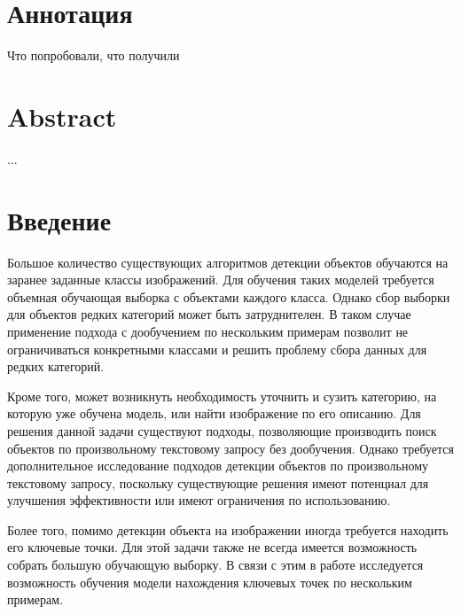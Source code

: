 \documentclass[a4paper,14pt]{article}
\begin{document}
    

    \section*{\normalsize \hfill Аннотация \hfill}

    Что попробовали, что получили

    \sloppy
    \newpage

    \section*{\normalsize \hfill Abstract \hfill}

    ...

    \newpage

    \tableofcontents
    \pagebreak

    \section*{Введение}

    Большое количество существующих алгоритмов детекции объектов обучаются на заранее заданные классы изображений.
    Для обучения таких моделей требуется объемная обучающая выборка с объектами каждого класса.
    Однако сбор выборки для объектов редких категорий может быть затруднителен.
    В таком случае применение подхода с дообучением по нескольким примерам позволит не ограничиваться конкретными классами и решить проблему сбора данных для редких категорий.

    Кроме того, может возникнуть необходимость уточнить и сузить категорию, на которую уже обучена модель, или найти изображение по его описанию.
    Для решения данной задачи существуют подходы, позволяющие производить поиск объектов по произвольному текстовому запросу без дообучения.
    Однако требуется дополнительное исследование подходов детекции объектов по произвольному текстовому запросу, поскольку существующие решения имеют потенциал для улучшения эффективности или имеют ограничения по использованию.

    Более того, помимо детекции объекта на изображении иногда требуется находить его ключевые точки.
    Для этой задачи также не всегда имеется возможность собрать большую обучающую выборку.
    В связи с этим в работе исследуется возможность обучения модели нахождения ключевых точек по нескольким примерам.

    \newpage
\end{document}
